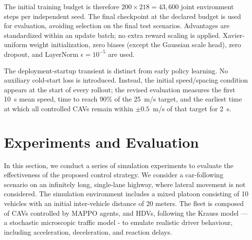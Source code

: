 \documentclass{ieeeaccess}
\begin{document}
The initial training budget is therefore $200\times218=43{,}600$ joint environment steps per independent seed. The final checkpoint at the declared budget is used for evaluation, avoiding selection on the final test scenarios. Advantages are standardized within an update batch; no extra reward scaling is applied. Xavier-uniform weight initialization, zero biases (except the Gaussian scale head), zero dropout, and LayerNorm $\epsilon=10^{-5}$ are used. %

The deployment-startup transient is distinct from early policy learning. No auxiliary cold-start loss is introduced. Instead, the initial speed/spacing condition appears at the start of every rollout; the revised evaluation measures the first 10~s mean speed, time to reach 90\% of the 25~m/s target, and the earliest time at which all controlled CAVs remain within $\pm0.5$~m/s of that target for 2~s. %

\section{Experiments and Evaluation}
\label{sec:exp_scenario}
In this section, we conduct a series of simulation experiments to evaluate the effectiveness of the proposed control strategy. We consider a car-following scenario on an infinitely long, single-lane highway, where lateral movement is not considered. The simulation environment includes a mixed platoon consisting of 10 vehicles with an initial inter-vehicle distance of 20 meters. The fleet is composed of CAVs controlled by MAPPO agents, and HDVs, following the Krauss model —a stochastic microscopic traffic model - to emulate realistic driver behaviour, including acceleration, deceleration, and reaction delays.
\end{document}
